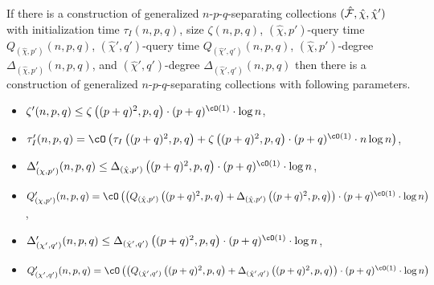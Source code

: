 \begin{lemma}\label{lem:twinreduceUniverse} If there is a construction of generalized $n$-$p$-$q$-separating collections $(\hat{\cal F},\hat{\chi},\hat{\chi}')$ with initialization time $\tau_I(n,p,q)$, size $\zeta(n,p,q)$, 
$(\hat{\chi},p')$-query time ${Q_{(\hat{\chi},p')}}(n,p,q)$, $(\hat{\chi}',q')$-query time ${Q_{(\hat{\chi}',q')}}(n,p,q)$, 
$(\hat{\chi},p')$-degree $\Delta_{(\hat{\chi},p')}(n,p,q)$, and $(\hat{\chi}',q')$-degree $\Delta_{(\hat{\chi}',q')}(n,p,q)$  
then there is a construction of generalized $n$-$p$-$q$-separating collections 
with following parameters.
\begin{itemize} \item 
$\zeta'(n,p,q) \leq \zeta\left((p+q)^2,p,q\right) \cdot  (p+q)^{\cO(1)} \cdot \log n$,
\item 
$\tau_I'(n,p,q) = \cO\left(\tau_I\left((p+q)^2,p,q\right) + \zeta\left((p+q)^2,p,q\right) \cdot (p+q)^{\cO(1)} \cdot n \log n\right)$,
\item 
$\Delta'_{(\chi,p')}(n,p,q) \leq \Delta_{(\hat{\chi},p')}\left((p+q)^2,p,q\right) \cdot  (p+q)^{\cO(1)} \cdot \log n$, 
\item 
${Q'_{(\chi,p')}}(n,p,q) = \cO\left(\left({Q_{(\hat{\chi},p')}}\left((p+q)^2,p,q\right) + \Delta_{(\hat{\chi},p')}\left((p+q)^2,p,q\right) \right) \cdot (p+q)^{\cO(1)} \cdot \log n\right)$,
\item 
$\Delta'_{(\chi',q')}(n,p,q)\leq \Delta_{(\hat{\chi}',q')}\left((p+q)^2,p,q\right) \cdot  (p+q)^{\cO(1)} \cdot \log n$,
\item 
${Q'_{(\chi',q')}}(n,p,q)=\cO\left(\left({Q_{(\hat{\chi}',q')}}\left((p+q)^2,p,q\right) + \Delta_{(\hat{\chi}',q')}\left((p+q)^2,p,q\right) \right) \cdot (p+q)^{\cO(1)} \cdot \log n\right)$
\end{itemize}
\end{lemma}
